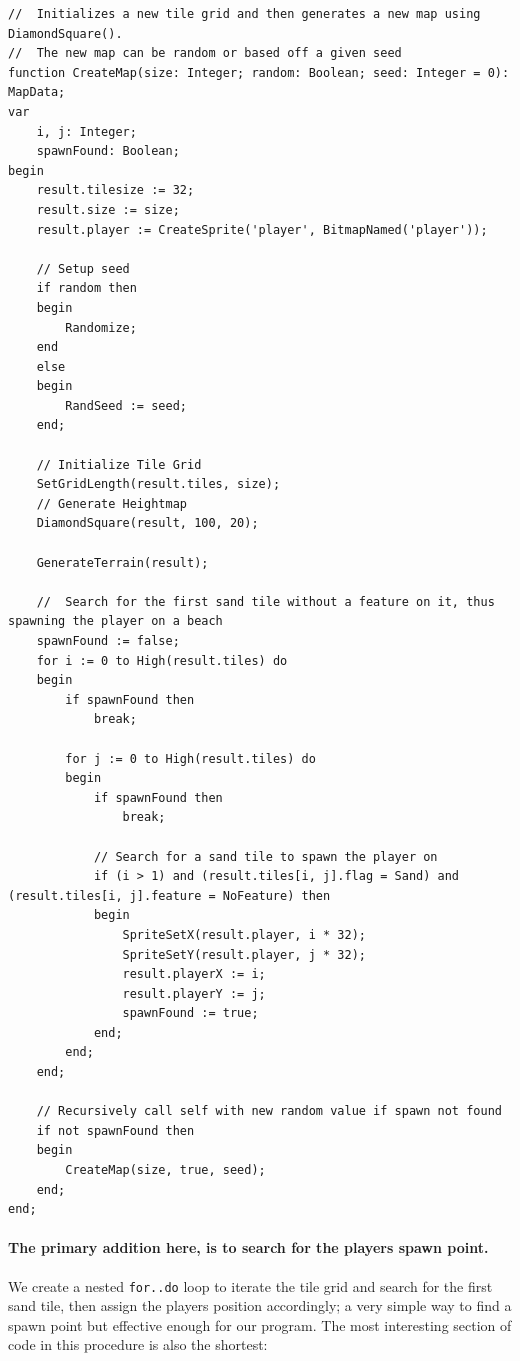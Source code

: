 \documentclass{article}
\begin{document}
\begin{adjustwidth}{-1cm}{-1cm}
\begin{mdframed}[backgroundcolor=darkgray]
\begin{verbatim}
//	Initializes a new tile grid and then generates a new map using DiamondSquare().
//	The new map can be random or based off a given seed
function CreateMap(size: Integer; random: Boolean; seed: Integer = 0): MapData;
var
	i, j: Integer;
	spawnFound: Boolean;
begin
	result.tilesize := 32;
	result.size := size;
	result.player := CreateSprite('player', BitmapNamed('player'));

	// Setup seed
	if random then
	begin
		Randomize;
	end
	else
	begin
		RandSeed := seed;
	end;

	// Initialize Tile Grid
	SetGridLength(result.tiles, size);
	// Generate Heightmap
	DiamondSquare(result, 100, 20);

	GenerateTerrain(result);

	//	Search for the first sand tile without a feature on it, thus spawning the player on a beach
	spawnFound := false;
	for i := 0 to High(result.tiles) do
	begin
		if spawnFound then
			break;

		for j := 0 to High(result.tiles) do
		begin
			if spawnFound then
				break;

			// Search for a sand tile to spawn the player on
			if (i > 1) and (result.tiles[i, j].flag = Sand) and (result.tiles[i, j].feature = NoFeature) then
			begin
				SpriteSetX(result.player, i * 32);
				SpriteSetY(result.player, j * 32);
				result.playerX := i;
				result.playerY := j;
				spawnFound := true;
			end;
		end;
	end;

	// Recursively call self with new random value if spawn not found
	if not spawnFound then
	begin
		CreateMap(size, true, seed);
	end;
end;
\end{verbatim}
\end{mdframed}
\end{adjustwidth}

\paragraph{The primary addition here, is to search for the players spawn point.} We create a nested \texttt{for..do} loop to iterate the tile grid and search for the first sand tile, then assign the players position accordingly; a very simple way to find a spawn point but effective enough for our program. The most interesting section of code in this procedure is also the shortest:
\end{document}
